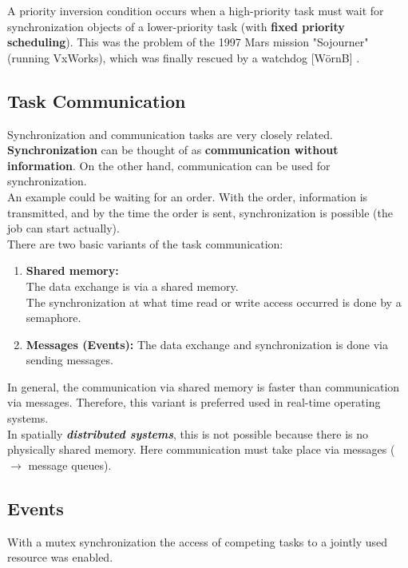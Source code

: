 A priority inversion condition occurs when a high-priority task must wait for synchronization objects of a lower-priority task (with \textbf{fixed priority scheduling}). This was the problem of the 1997 Mars mission "Sojourner" (running VxWorks), which was finally rescued by a watchdog [W\"{o}rnB] .


\subsection{Task Communication}

Synchronization and communication tasks are very closely related. \textbf{Synchronization} can be thought of as\textbf{ communication without information}. On the other hand, communication can be used for synchronization.\\

An example could be waiting for an order. With the order, information is transmitted, and by the time the order is sent, synchronization is possible (the job can start actually).\\

There are two basic variants of the task communication:

\begin{enumerate}
	\item  \textbf{Shared memory: } \\
	The data exchange is via a shared memory.\\
	The synchronization at what time read or write access occurred is done by a semaphore.
	\item  \textbf{Messages (Events): }The data exchange and synchronization is done via sending messages.
\end{enumerate}

In general, the communication via shared memory is faster than communication via messages. Therefore, this variant is preferred used in real-time operating systems. \\

In spatially \textbf{\textit{distributed systems}}, this is not possible because there is no physically shared memory. Here communication must take place via messages ($\rightarrow$ message queues).

\subsection{Events}

With a mutex synchronization the access of competing tasks to a jointly used resource was enabled. \\

